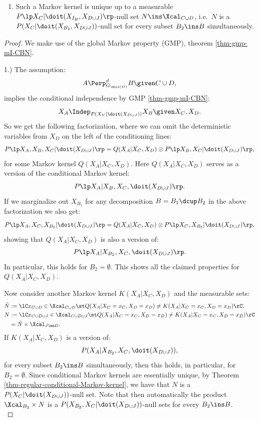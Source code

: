 \begin{Cor}[Do-calculus]
\begin{enumerate}
            that is a version of:  
            \[ P\lp X_A|\doit(X_{B_2}),X_C,\doit(X_{D\cup J})\rp\]
            for every subset $B_2 \ins B$ simultaneously. 
            Note that this Markov kernel is only dependent on $x_C$ and $x_D$, and constant in $x_{J \sm D}$.
        \item[] Such a Markov kernel is unique up to a measurable $P\lp X_C|\doit(X_{I_B},X_{D\cup J})\rp$-null set $N \ins \Xcal_{C\cup D}$, i.e.\ $N$ is a $P(X_C|\doit(X_{B_2},X_{D\cup J}))$-null set for every subset $B_2 \ins B$ simultaneously.
    \end{enumerate}
\begin{proof}
    We make use of the global Markov property (GMP), theorem \ref{thm-gmp-mI-CBN}.

1.) The assumption:
            \[ A \Perp^d_{G_{\doit(D)}} B \given C \cup D,   \]
implies the conditional independence by GMP \ref{thm-gmp-mI-CBN}:
  \[ X_A \Indep_{P(X_V|\doit(X_{D\cup J}))} X_B \given X_C,X_D.\]
So  we get the following factorization, where we can omit the deterministic variables from $X_D$ on the left of the conditioning lines:
  \[ P\lp X_A,X_B,X_C|\doit(X_{D\cup J})\rp = Q(X_A|X_C,X_D) \otimes P\lp X_B,X_C|\doit(X_{D\cup J})\rp,\]
for some Markov kernel $Q(X_A|X_C,X_D)$. Here
$Q(X_A|X_C,X_D)$ serves as a version of the conditional Markov kernel:
  \[P\lp X_A|X_B,X_C,\doit(X_{D\cup J})\rp.\]
If we marginalize out $X_{B_1}$ for any decomposition $B=B_1 \dcup B_2$ 
in the above factorization we also get:
  \[ P\lp X_A,X_C,X_{B_2}|\doit(X_{D\cup J})\rp = Q(X_A|X_C,X_D) \otimes P\lp X_C,X_{B_2}|\doit(X_{D\cup J})\rp,\]
showing that $Q(X_A|X_C,X_D)$ is also a version of:
  \[P\lp X_A|X_{B_2},X_C,\doit(X_{D\cup J})\rp.\]
In particular, this holds for $B_2 = \emptyset$. This shows all the claimed properties for $Q(X_A|X_C,X_D)$.

Now consider another Markov kernel $K(X_A|X_C,X_D)$ and the measurable sets:
\begin{align*}
    \tilde N &:= \lC x_{C \cup D} \in \Xcal_{C \cup D} \st Q(X_A|X_C=x_C,X_D=x_D) \neq K(X_A|X_C=x_C,X_D=x_D)  \rC,\\
     N &:= \lC x_{C \cup D \cup J} \in \Xcal_{C \cup D \cup J} \st Q(X_A|X_C=x_C,X_D=x_D) \neq K(X_A|X_C=x_C,X_D=x_D)  \rC \\
       &= \tilde N \times \Xcal_{J \sm D}.
\end{align*}
If $K(X_A|X_C,X_D)$ is a version of: 
\[P(X_A|X_{B_2},X_C,\doit(X_{D\cup J})),\] 
for every subset $B_2 \ins B$ simultaneously, then this holds, in particular, for $B_2 = \emptyset$.
Since conditional Markov kernels are essentially unique, by Theorem \ref{thm-regular-conditional-Markov-kernel}, we have that $N$ is a $P(X_C|\doit(X_{D\cup J}))$-null set.
Note that then automatically the product $\Xcal_{B_2} \times N$ is a $P(X_{B_2},X_C|\doit(X_{D\cup J}))$-null sets for every $B_2 \ins B$. \\



\end{proof}
\end{Cor}
